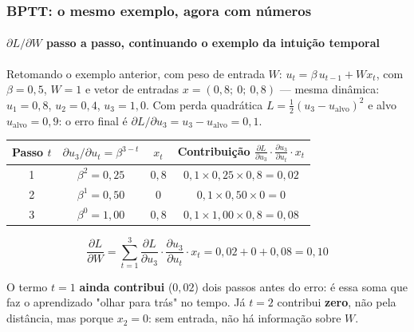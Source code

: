 \begin{frame}[shrink]
	\frametitle{BPTT: o mesmo exemplo, agora com números}
	\framesubtitle{$\partial L/\partial W$ passo a passo, continuando o exemplo da intuição temporal}
	\small
	\par Retomando o exemplo anterior, com peso de entrada $W$: $u_t = \beta\,u_{t-1} + W x_t$, com $\beta=0{,}5$, $W=1$ e vetor de entradas $x=(0{,}8;\ 0;\ 0{,}8)$ --- mesma dinâmica: $u_1=0{,}8$, $u_2=0{,}4$, $u_3=1{,}0$. Com perda quadrática $L=\tfrac12(u_3-u_{\mathrm{alvo}})^2$ e alvo $u_{\mathrm{alvo}}=0{,}9$: o erro final é $\partial L/\partial u_3 = u_3-u_{\mathrm{alvo}} = 0{,}1$.
	\begin{center}
		\footnotesize
		\begin{tabular}{cccc}
			\toprule
			\textbf{Passo $t$} & \textbf{$\partial u_3/\partial u_t = \beta^{3-t}$} & \textbf{$x_t$} & \textbf{Contribuição $\frac{\partial L}{\partial u_3}\cdot\frac{\partial u_3}{\partial u_t}\cdot x_t$} \\
			\midrule
			1 & $\beta^2 = 0{,}25$ & $0{,}8$ & $0{,}1 \times 0{,}25 \times 0{,}8 = 0{,}02$ \\
			2 & $\beta^1 = 0{,}50$ & $0$ & $0{,}1 \times 0{,}50 \times 0 = 0$ \\
			3 & $\beta^0 = 1{,}00$ & $0{,}8$ & $0{,}1 \times 1{,}00 \times 0{,}8 = 0{,}08$ \\
			\bottomrule
		\end{tabular}
	\end{center}
	\begin{equation*}
		\frac{\partial L}{\partial W} = \sum_{t=1}^{3} \frac{\partial L}{\partial u_3}\cdot\frac{\partial u_3}{\partial u_t}\cdot x_t = 0{,}02 + 0 + 0{,}08 = 0{,}10
	\end{equation*}
	\par O termo $t{=}1$ \textbf{ainda contribui} ($0{,}02$) dois passos antes do erro: é essa soma que faz o aprendizado "olhar para trás" no tempo. Já $t{=}2$ contribui \textbf{zero}, não pela distância, mas porque $x_2=0$: sem entrada, não há informação sobre $W$.
\end{frame}

